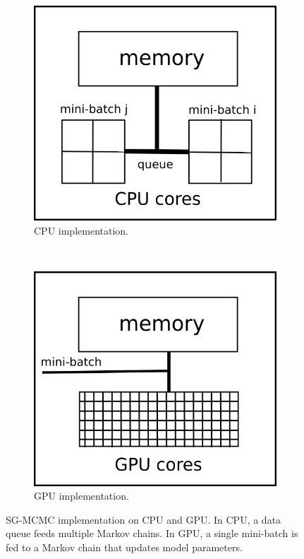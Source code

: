\documentclass[conference]{IEEEtran}
\begin{document}
 
\begin{figure}
	\centering
	\begin{subfigure}[b]{0.4\textwidth}
		\includegraphics[width=\textwidth]{figures/cpu_architechture}
		\caption{CPU implementation.}
		\label{fig:cpuarchitechture}
	\end{subfigure}
	~ %
	\begin{subfigure}[b]{0.4\textwidth}
		\includegraphics[width=\textwidth]{figures/gpu_architechture}
		\caption{GPU implementation.}
		\label{fig:gpuarchitechture}
	\end{subfigure}
	\caption{SG-MCMC implementation on CPU and GPU. In CPU, a data queue feeds multiple Markov chains. In GPU, a single mini-batch is fed to a Markov chain that updates model parameters.}\label{fig:sgld_architechture}
\end{figure}
 
\end{document}
